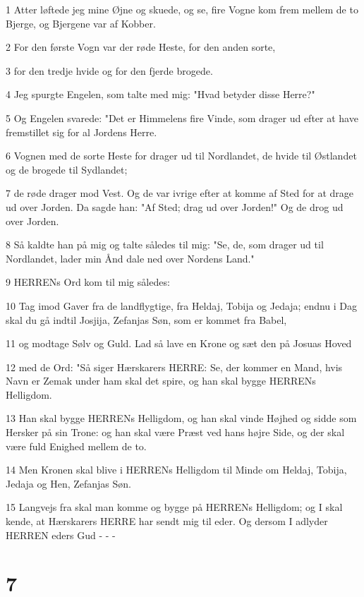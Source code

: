\par 1 Atter løftede jeg mine Øjne og skuede, og se, fire Vogne kom frem mellem de to Bjerge, og Bjergene var af Kobber.
\par 2 For den første Vogn var der røde Heste, for den anden sorte,
\par 3 for den tredje hvide og for den fjerde brogede.
\par 4 Jeg spurgte Engelen, som talte med mig: "Hvad betyder disse Herre?"
\par 5 Og Engelen svarede: "Det er Himmelens fire Vinde, som drager ud efter at have fremstillet sig for al Jordens Herre.
\par 6 Vognen med de sorte Heste for drager ud til Nordlandet, de hvide til Østlandet og de brogede til Sydlandet;
\par 7 de røde drager mod Vest. Og de var ivrige efter at komme af Sted for at drage ud over Jorden. Da sagde han: "Af Sted; drag ud over Jorden!" Og de drog ud over Jorden.
\par 8 Så kaldte han på mig og talte således til mig: "Se, de, som drager ud til Nordlandet, lader min Ånd dale ned over Nordens Land."
\par 9 HERRENs Ord kom til mig således:
\par 10 Tag imod Gaver fra de landflygtige, fra Heldaj, Tobija og Jedaja; endnu i Dag skal du gå indtil Josjija, Zefanjas Søn, som er kommet fra Babel,
\par 11 og modtage Sølv og Guld. Lad så lave en Krone og sæt den på Josuas Hoved
\par 12 med de Ord: "Så siger Hærskarers HERRE: Se, der kommer en Mand, hvis Navn er Zemak under ham skal det spire, og han skal bygge HERRENs Helligdom.
\par 13 Han skal bygge HERRENs Helligdom, og han skal vinde Højhed og sidde som Hersker på sin Trone: og han skal være Præst ved hans højre Side, og der skal være fuld Enighed mellem de to.
\par 14 Men Kronen skal blive i HERRENs Helligdom til Minde om Heldaj, Tobija, Jedaja og Hen, Zefanjas Søn.
\par 15 Langvejs fra skal man komme og bygge på HERRENs Helligdom; og I skal kende, at Hærskarers HERRE har sendt mig til eder. Og dersom I adlyder HERREN eders Gud - - -

\chapter{7}

